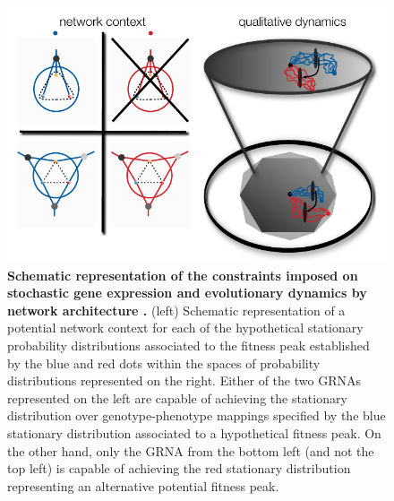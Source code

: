 \begin{figure}[!ht]
\centering
\noindent\includegraphics[width=0.9\columnwidth]{fig/stochdynscheme.pdf}
\caption{{\bf Schematic representation of the constraints imposed on stochastic gene expression and evolutionary dynamics by network architecture .} (left) Schematic representation of a potential network context for each of the hypothetical stationary probability distributions associated to the fitness peak established by the blue and red dots within the spaces of probability distributions represented on the right. Either of the two GRNAs represented on the left are capable of achieving the stationary distribution over genotype-phenotype mappings specified by the blue stationary distribution associated to a hypothetical fitness peak. On the other hand, only the GRNA from the bottom left (and not the top left) is capable of achieving the red stationary distribution representing an alternative potential fitness peak.}
\label{fig:stochdynscheme}
\end{figure}
